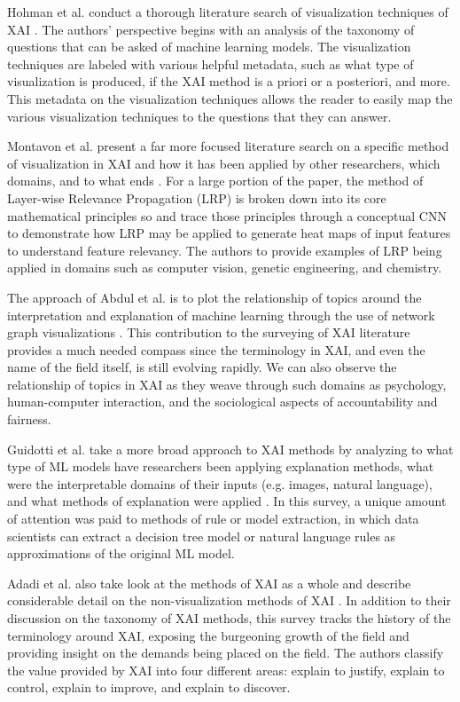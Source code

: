 Hohman et al. conduct a thorough literature search of visualization techniques of XAI \cite{Hohman2018}.  The authors' perspective begins with an analysis of the taxonomy of questions that can be asked of machine learning models.  The visualization techniques are labeled with various helpful metadata, such as what type of visualization is produced, if the XAI method is a priori or a posteriori, and more.  This metadata on the visualization techniques allows the reader to easily map the various visualization techniques to the questions that they can answer.

Montavon et al. present a far more focused literature search on a specific method of visualization in XAI and how it has been applied by other researchers, which domains, and to what ends \cite{MONTAVON20181}.  For a large portion of the paper, the method of Layer-wise Relevance Propagation (LRP) is broken down into its core mathematical principles so and trace those principles through a conceptual CNN to demonstrate how LRP may be applied to generate heat maps of input features to understand feature relevancy.  The authors to provide examples of LRP being applied in domains such as computer vision, genetic engineering, and chemistry.

The approach of Abdul et al. is to plot the relationship of topics around the interpretation and explanation of machine learning through the use of network graph visualizations \cite{Abdul:2018:TTE:3173574.3174156}.  This contribution to the surveying of XAI literature provides a much needed compass since the terminology in XAI, and even the name of the field itself, is still evolving rapidly.  We can also observe the relationship of topics in XAI as they weave through such domains as psychology, human-computer interaction, and the sociological aspects of accountability and fairness.

Guidotti et al. take a more broad approach to XAI methods by analyzing to what type of ML models have researchers been applying explanation methods, what were the interpretable domains of their inputs (e.g. images, natural language), and what methods of explanation were applied \cite{Guidotti:2018:SME:3271482.3236009}.  In this survey, a unique amount of attention was paid to methods of rule or model extraction, in which data scientists can extract a decision tree model or natural language rules as approximations of the original ML model.

Adadi et al. also take look at the methods of XAI as a whole and describe considerable detail on the non-visualization methods of XAI \cite{Adadi2018}.  In addition to their discussion on the taxonomy of XAI methods, this survey tracks the history of the terminology around XAI, exposing the burgeoning growth of the field and providing insight on the demands being placed on the field.  The authors classify the value provided by XAI into four different areas: explain to justify, explain to control, explain to improve, and explain to discover.

